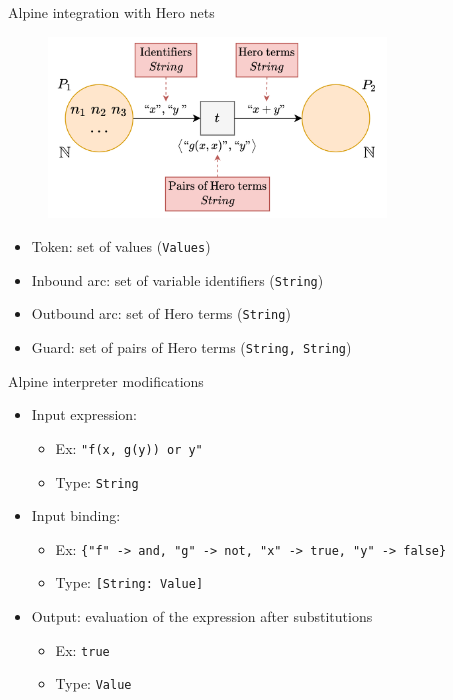 \documentclass[10pt]{beamer}
\begin{document}
\begin{frame}[fragile]{Alpine integration with Hero nets}
    \begin{figure}
        \centering
        \includegraphics[width=0.80\textwidth]{03integration.png}
    \end{figure}
    \begin{itemize}
        \item Token: set of values (\texttt{Values})
        \item Inbound arc: set of variable identifiers (\texttt{String})
        \item Outbound arc: set of Hero terms (\texttt{String})
        \item Guard: set of pairs of Hero terms (\texttt{String, String})
    \end{itemize}
\end{frame}

\begin{frame}[fragile]{Alpine interpreter modifications}
    \begin{itemize}
        \setlength\itemsep{1.15em}
        \item Input expression:\vspace{\topsep}\begin{itemize}
            \setlength\itemsep{0.45em}
            \item Ex: \texttt{"f(x, g(y)) or y"}
            \item Type: \texttt{String}
        \end{itemize}
        \item Input binding:\vspace{\topsep}\begin{itemize}
            \setlength\itemsep{0.45em}
            \item Ex: \texttt{\{"f" -> and, "g" -> not, "x" -> true, "y" -> false\}}
            \item Type: \texttt{[String: Value]}
        \end{itemize}
        \item Output: evaluation of the expression after substitutions\vspace{\topsep}\begin{itemize}
            \setlength\itemsep{0.45em}
            \item Ex: \texttt{true}
            \item Type: \texttt{Value}
        \end{itemize}
    \end{itemize}
\end{frame}
\end{document}
